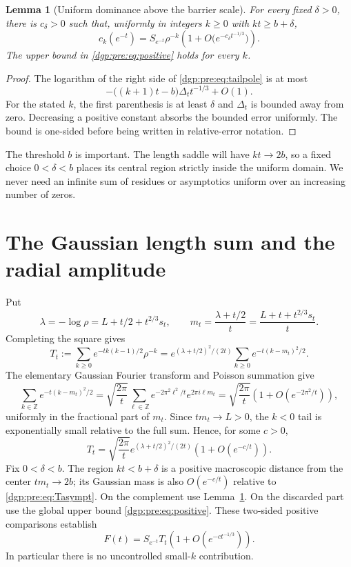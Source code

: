 \documentclass[11pt,letterpaper]{article}
\numberwithin{equation}{section}
\newtheorem{lemma}[theorem]{Lemma}
\theoremstyle{remark}\newtheorem{remark}[theorem]{Remark}
\newcommand{\ZZ}{\mathbb Z}
\begin{document}
\begin{lemma}[Uniform dominance above the barrier scale]\label{dgp:pre:lem:pole}
For every fixed $\delta>0$, there is $c_\delta>0$ such that, uniformly
in integers $k\geq0$ with $kt\geq b+\delta$,
\begin{equation}
 c_k(e^{-t})=S_{e^{-t}}\rho^{-k}
       \left(1+O\bigl(e^{-c_\delta t^{-1/3}}\bigr)\right).
 \label{dgp:pre:eq:uniformpole}
\end{equation}
The upper bound in \eqref{dgp:pre:eq:positive} holds for every $k$.
\end{lemma}
\begin{proof}
The logarithm of the right side of \eqref{dgp:pre:eq:tailpole} is at most
\[
 -\bigl((k+1)t-b\bigr)\Delta_t t^{-1/3}+O(1).
\]
For the stated $k$, the first parenthesis is at least $\delta$ and
$\Delta_t$ is bounded away from zero. Decreasing a positive constant
absorbs the bounded error uniformly. The bound is one-sided before
being written in relative-error notation.
\end{proof}

The threshold $b$ is important. The length saddle will have
$kt\to2b$, so a fixed choice $0<\delta<b$ places its central region
strictly inside the uniform domain. We never need an infinite sum of
residues or asymptotics uniform over an increasing number of zeros.

\section{The Gaussian length sum and the radial amplitude}\label{dgp:pre:sec:radial}
Put
\[
 \lambda=-\log\rho=L+t/2+t^{2/3}s_t,\qquad
 m_t=\frac{\lambda+t/2}{t}=\frac{L+t+t^{2/3}s_t}{t}.
\]
Completing the square gives
\begin{equation}
 T_t:=\sum_{k\geq0}e^{-t k(k-1)/2}\rho^{-k}
 =e^{(\lambda+t/2)^2/(2t)}
       \sum_{k\geq0}e^{-t(k-m_t)^2/2}.
 \label{dgp:pre:eq:T}
\end{equation}
The elementary Gaussian Fourier transform and Poisson summation give
\[
 \sum_{k\in\ZZ}e^{-t(k-m_t)^2/2}
 =\sqrt{\frac{2\pi}t}
   \sum_{\ell\in\ZZ}e^{-2\pi^2\ell^2/t}e^{2\pi i\ell m_t}
 =\sqrt{\frac{2\pi}t}\left(1+O(e^{-2\pi^2/t})\right),
\]
uniformly in the fractional part of $m_t$. Since
$tm_t\to L>0$, the $k<0$ tail is exponentially small relative to the
full sum. Hence, for some $c>0$,
\begin{equation}
 T_t=\sqrt{\frac{2\pi}t}
        e^{(\lambda+t/2)^2/(2t)}(1+O(e^{-c/t})).
 \label{dgp:pre:eq:Tasympt}
\end{equation}
Fix $0<\delta<b$. The region $kt<b+\delta$ is a positive macroscopic
distance from the center $tm_t\to2b$; its Gaussian mass is also
$O(e^{-c/t})$ relative to \eqref{dgp:pre:eq:Tasympt}. On the complement use
Lemma~\ref{dgp:pre:lem:pole}. On the discarded part use the global upper bound
\eqref{dgp:pre:eq:positive}. These two-sided positive comparisons establish
\begin{equation}
 F(t)=S_{e^{-t}}T_t\left(1+O(e^{-c t^{-1/3}})\right).
 \label{dgp:pre:eq:FS}
\end{equation}
In particular there is no uncontrolled small-$k$ contribution.
\end{document}
